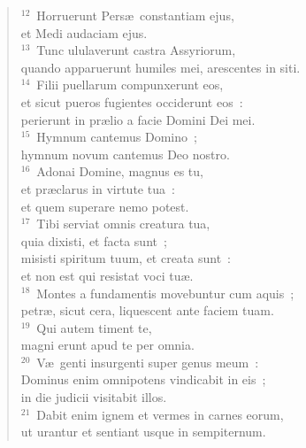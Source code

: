 \begin{verse}
${}^{12}$~Horruerunt Pers\ae\ constantiam ejus,\\ et Medi audaciam ejus.\\
${}^{13}$~Tunc ululaverunt castra Assyriorum,\\ quando apparuerunt humiles mei, arescentes in siti.\\
${}^{14}$~Filii puellarum compunxerunt eos,\\ et sicut pueros fugientes occiderunt eos~:\\ perierunt in pr\ae lio a facie Domini Dei mei.\\
${}^{15}$~Hymnum cantemus Domino~;\\ hymnum novum cantemus Deo nostro.\\
${}^{16}$~Adonai Domine, magnus es tu,\\ et pr\ae clarus in virtute tua~:\\ et quem superare nemo potest.\\
${}^{17}$~Tibi serviat omnis creatura tua,\\ quia dixisti, et facta sunt~;\\ misisti spiritum tuum, et creata sunt~:\\ et non est qui resistat voci tu\ae .\\
${}^{18}$~Montes a fundamentis movebuntur cum aquis~;\\ petr\ae , sicut cera, liquescent ante faciem tuam.\\
${}^{19}$~Qui autem timent te,\\ magni erunt apud te per omnia.\\
${}^{20}$~V\ae\ genti insurgenti super genus meum~:\\ Dominus enim omnipotens vindicabit in eis~;\\ in die judicii visitabit illos.\\
${}^{21}$~Dabit enim ignem et vermes in carnes eorum,\\ ut urantur et sentiant usque in sempiternum.\end{verse}


